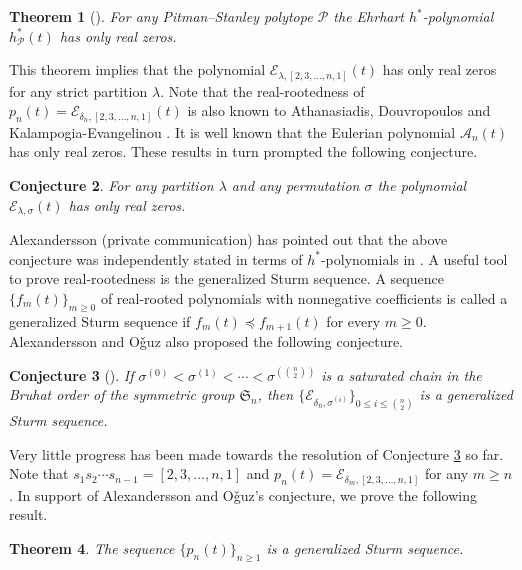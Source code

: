 \documentclass[12pt]{article}
\newtheorem{thm}{Theorem}[section]
\newtheorem{conj}[thm]{Conjecture}
\newcommand{\PP}{p}
\newcommand{\E}{\mathcal{E}}
\numberwithin{equation}{section}
\begin{document}
\begin{thm}[{\cite[Theorem 1.2]{Avila-Ferroni-Morales-2026b}}]
For any Pitman–Stanley polytope $\mathcal{P}$ the Ehrhart $h^*$-polynomial $h^*_{\mathcal{P}}(t)$ has only real zeros. 
\end{thm}

This theorem implies that the polynomial ${\mathcal{E}}_{\lambda,[2,3,\ldots,n,1]}(t)$ has only real zeros for any strict partition $\lambda$. 
Note that the real-rootedness of $\PP_n(t)={\mathcal{E}}_{\delta_n,[2,3,\ldots,n,1]}(t)$ is also known to Athanasiadis, Douvropoulos and Kalampogia-Evangelinou \cite[Theorem 3 (a)]{Athanasiadis-Douvropoulos-Kalampogia-Evangelinou-2024}.
It is well known that the Eulerian polynomial $\mathcal{A}_n(t)$ has only real zeros. 
These results in turn prompted the following conjecture.

\begin{conj}
For any partition $\lambda$ and any permutation $\sigma$ the polynomial ${\mathcal{E}}_{\lambda,\sigma}(t)$ has only real zeros. 
\end{conj}

Alexandersson (private communication) has pointed out that the above conjecture was independently stated in terms of $h^*$-polynomials in \cite{Alexandersson-Oguz-2025}. 
A useful tool to prove real-rootedness is the generalized Sturm sequence. A sequence $\{f_m(t)\}_{m\geq0}$ of real-rooted polynomials with nonnegative coefficients is called a generalized Sturm sequence if $f_m(t)\preceq f_{m+1}(t)$ for every $m\geq0$. 
Alexandersson and O\v{g}uz \cite{Alexandersson-Oguz-2025} also proposed the following conjecture.

\begin{conj}[\cite{Alexandersson-Oguz-2025}]\label{conj-AO}
If $\sigma^{(0)}<\sigma^{(1)}<\cdots<\sigma^{(\binom{n}{2})}$ is a saturated chain in the Bruhat order of the symmetric group $\mathfrak{S}_n$, then $\{\E_{\delta_n, \sigma^{(i)}}\}_{0\le i\le \binom{n}{2}}$ is a generalized Sturm sequence.
\end{conj}

Very little progress has been made towards the resolution of Conjecture \ref{conj-AO} so far. Note that $s_1s_2\cdots s_{n-1}=[2,3,\ldots,n,1]$ and $\PP_{n}(t)=\E_{\delta_m, [2,3,\ldots,n,1]}$ for any $m\geq n$. 
In support of Alexandersson and O\v{g}uz's conjecture, we prove the following result. 
 
\begin{thm}\label{thm_parking-sturm}
The sequence $\{\PP_{n}(t)\}_{n\geq 1}$ is a generalized Sturm sequence.
\end{thm}
\end{document}
